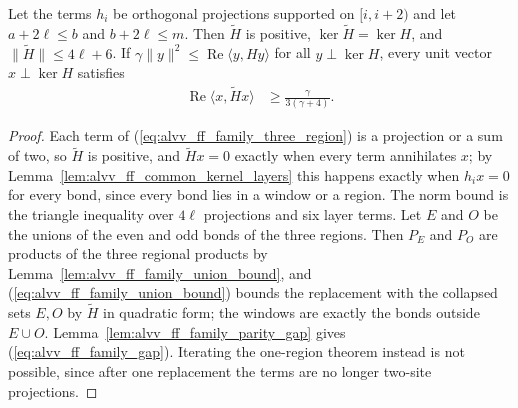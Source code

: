 \begin{lemma}
    \label{lem:alvv_ff_family_three_region}
    \leanok
    Let the terms $h_i$ be orthogonal projections supported on $[i,i+2)$ and
    let $a+2\ell\le b$ and $b+2\ell\le m$. Then $\widetilde H$ is positive,
    $\ker\widetilde H=\ker H$, and $\|\widetilde H\|\le4\ell+6$. If
    $\gamma\|y\|^2\le\operatorname{Re}\langle y,Hy\rangle$ for all
    $y\perp\ker H$, every unit vector $x\perp\ker H$ satisfies
    \begin{align}
        \operatorname{Re}\langle x,\widetilde Hx\rangle
         & \ge\frac{\gamma}{3(\gamma+4)}.
        \label{eq:alvv_ff_family_gap}
    \end{align}
\end{lemma}
\begin{proof}\leanok
    Each term of (\ref{eq:alvv_ff_family_three_region}) is a projection or a
    sum of two, so $\widetilde H$ is positive, and $\widetilde Hx=0$ exactly
    when every term annihilates $x$; by
    Lemma~\ref{lem:alvv_ff_common_kernel_layers} this happens exactly when
    $h_ix=0$ for every bond, since every bond lies in a window or a region. The
    norm bound is the triangle inequality over $4\ell$ projections and six
    layer terms. Let $E$ and $O$ be the unions of the even and odd bonds of the
    three regions. Then $P_E$ and $P_O$ are products of the three regional
    products by Lemma~\ref{lem:alvv_ff_family_union_bound}, and
    (\ref{eq:alvv_ff_family_union_bound}) bounds the replacement with the
    collapsed sets $E,O$ by $\widetilde H$ in quadratic form; the windows are
    exactly the bonds outside $E\cup O$. Lemma~\ref{lem:alvv_ff_family_parity_gap}
    gives (\ref{eq:alvv_ff_family_gap}). Iterating the one-region theorem
    instead is not possible, since after one replacement the terms are no
    longer two-site projections.
\end{proof}

